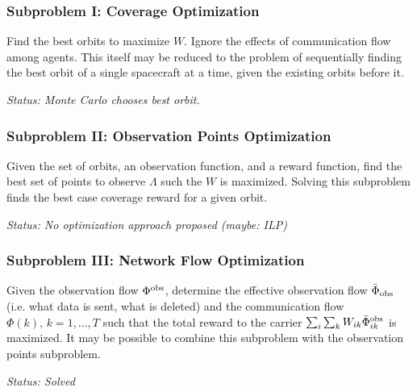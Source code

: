 \documentclass[12pt]{article}
\begin{document}
\subsubsection*{Subproblem I: Coverage Optimization} 

Find the best orbits to maximize $W$. Ignore the effects of communication flow among agents. This itself may be reduced to the problem of sequentially finding the best orbit of a single spacecraft at a time, given the existing orbits before it. 

\textit{Status: Monte Carlo chooses best orbit. }

\subsubsection*{Subproblem II: Observation Points Optimization} 
Given the set of orbits, an observation function, and a reward function, find the best set of points to observe $\Lambda$ such the $W$ is maximized. Solving this subproblem finds the best case coverage reward for a given orbit. 

\textit{Status: No optimization approach proposed (maybe: ILP)}


\subsubsection*{Subproblem III: Network Flow Optimization}
Given the observation flow $\Phi^{\rm obs}$, determine the effective observation flow $\bar{\Phi}_{\rm obs}$ (i.e. what data is sent, what is deleted) and the communication flow $\Phi(k), \, k=1,...,T$ such that the total reward to the carrier $\sum_i\sum_k W_{ik}\bar{\Phi}_{ik}^{\rm obs}$ is maximized. It may be possible to combine this subproblem with the observation points subproblem.  

\textit{Status: Solved}







\end{document}
